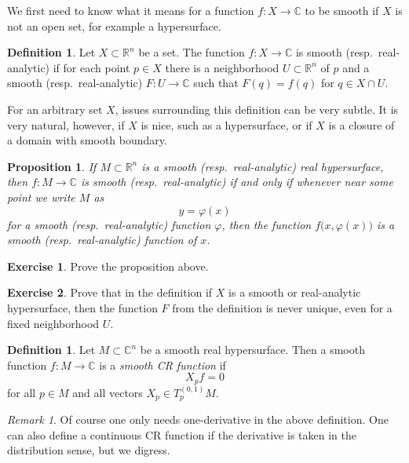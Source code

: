\documentclass[12pt,openany]{book}
\newcommand{\C}{{\mathbb{C}}}
\newcommand{\R}{{\mathbb{R}}}
\newcommand{\myindex}[1]{#1\index{#1}}
\theoremstyle{plain}
\newtheorem{prop}[thm]{Proposition}
\theoremstyle{remark}
\newtheorem{remark}[thm]{Remark}
\theoremstyle{definition}
\newtheorem{defn}[thm]{Definition}
\newenvironment{exbox}{%
    \def\FrameCommand{\vrule width 1pt \relax\hspace {10pt}}%
    \MakeFramed {\advance \hsize -\width \FrameRestore }%
}{%
    \endMakeFramed
}
\theoremstyle{exercise}
\newtheorem{exercise}{Exercise}[section]
\theoremstyle{example}
\begin{document}
We first need to know what it means for a function $f \colon X \to \C$
to be smooth if $X$ is not an open set, for example a hypersurface.

\begin{defn}
Let $X \subset \R^n$ be a set.
The function $f \colon X \to \C$ is smooth (resp.\
real-analytic) if for each point $p \in X$ there is a
neighborhood $U \subset \R^n$ of $p$ and a smooth (resp.\ real-analytic) $F
\colon U \to \C$ such that $F(q) = f(q)$ for $q \in X \cap U$.
\end{defn}

For an arbitrary set $X$, issues surrounding this definition can be very subtle.  It
is very natural, however, if $X$ is nice, such as a hypersurface, or if $X$ is
a closure of a domain with smooth boundary.

\begin{prop}
If $M \subset \R^n$ is a smooth (resp.\ real-analytic) real hypersurface, then $f \colon M \to \C$
is smooth (resp.\ real-analytic) if and only if whenever near some point we write $M$
as
\begin{equation*}
y = \varphi(x)
\end{equation*}
for a smooth (resp.\ real-analytic) function $\varphi$, then
the function $f\bigl(x,\varphi(x)\bigr)$ is a smooth (resp.\ real-analytic) function of $x$.
\end{prop}

\begin{exbox}
\begin{exercise}
Prove the proposition above.
\end{exercise}

\begin{exercise}
Prove that in the definition if $X$ is a smooth or real-analytic
hypersurface, then the function $F$ from the definition is never unique,
even for a fixed neighborhood $U$.
\end{exercise}
\end{exbox}

\begin{defn}
Let $M \subset \C^n$ be a smooth real hypersurface.  Then
a smooth function $f \colon M \to \C$ is a
\emph{\myindex{smooth CR function}} if
\begin{equation*}
X_p f = 0
\end{equation*}
for all $p \in M$ and all vectors $X_p \in T^{(0,1)}_p M$.
\end{defn}

\begin{remark}
Of course one only needs one-derivative in the above definition.  One can also
define a continuous CR function if the derivative is taken in the
distribution sense, but we digress.
\end{remark}
\end{document}
